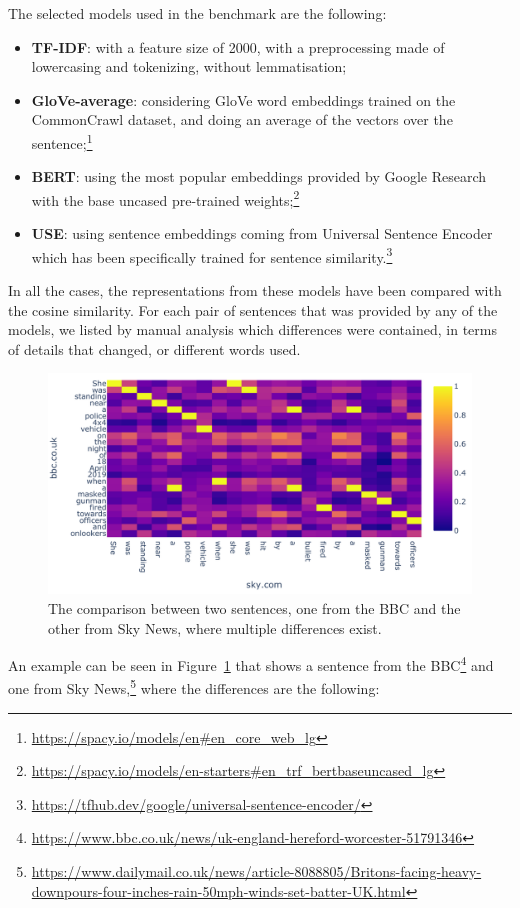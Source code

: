 The selected models used in the benchmark are the following:
\begin{itemize}
    \item \textbf{TF-IDF}: with a feature size of 2000, with a preprocessing made of lowercasing and tokenizing, without lemmatisation;
    \item \textbf{GloVe-average}: considering GloVe word embeddings trained on the CommonCrawl dataset, and doing an average of the vectors over the sentence;\footnote{\url{https://spacy.io/models/en\#en_core_web_lg}}
    \item \textbf{BERT}: using the most popular embeddings provided by Google Research~\cite{devlin2018bert} with the base uncased pre-trained weights;\footnote{\url{https://spacy.io/models/en-starters\#en_trf_bertbaseuncased_lg}}
    \item \textbf{USE}: using sentence embeddings coming from Universal Sentence Encoder~\cite{cer2018universal} which has been specifically trained for sentence similarity.\footnote{\url{https://tfhub.dev/google/universal-sentence-encoder/}}
\end{itemize}

In all the cases, the representations from these models have been compared with the cosine similarity.
For each pair of sentences that was provided by any of the models, we listed by manual analysis which differences were contained, in terms of details that changed, or different words used.


\begin{figure}[!htb]
    \centering
    \includegraphics[width=0.9\linewidth]{figures/lyra.pdf}
    \caption{The comparison between two sentences, one from the BBC and the other from Sky News, where multiple differences exist.}
    \label{fig:lyra}
\end{figure}

An example can be seen in Figure~\ref{fig:lyra} that shows a sentence from the BBC\footnote{\url{https://www.bbc.co.uk/news/uk-england-hereford-worcester-51791346}} and one from Sky News,\footnote{\url{https://www.dailymail.co.uk/news/article-8088805/Britons-facing-heavy-downpours-four-inches-rain-50mph-winds-set-batter-UK.html}} where the differences are the following:

